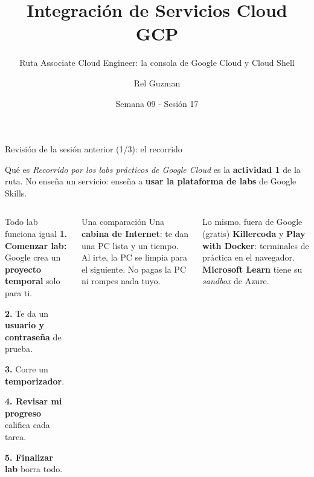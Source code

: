 \documentclass[aspectratio=169,10pt,c]{beamer}
\title{Integración de Servicios Cloud GCP}
\subtitle{Ruta Associate Cloud Engineer: la consola de Google Cloud y Cloud Shell}
\date{Semana 09 - Sesión 17}
\author{Rel Guzman}
\begin{document}
{\maketitle}

\begin{frame}{Revisión de la sesión anterior (1/3): el recorrido}
\begin{block}{Qué es}
\small \emph{Recorrido por los labs prácticos de Google Cloud} es la \textbf{actividad 1} de la ruta. No enseña un servicio: enseña a \textbf{usar la plataforma de labs} de Google Skills.
\end{block}
\begin{columns}[T,onlytextwidth]
\begin{exampleblock}{Todo lab funciona igual}
\small
\textbf{1. Comenzar lab:} Google crea un \textbf{proyecto temporal} solo para ti.\par\smallskip
\textbf{2.} Te da un \textbf{usuario y contraseña} de prueba.\par\smallskip
\textbf{3.} Corre un \textbf{temporizador}.\par\smallskip
\textbf{4. Revisar mi progreso} califica cada tarea.\par\smallskip
\textbf{5. Finalizar lab} borra todo.
\end{exampleblock}
\begin{block}{Una comparación}
\small Una \textbf{cabina de Internet}: te dan una PC lista y un tiempo. Al irte, la PC se limpia para el siguiente. No pagas la PC ni rompes nada tuyo.
\end{block}
\begin{alertblock}{Lo mismo, fuera de Google (gratis)}
\small \textbf{Killercoda} y \textbf{Play with Docker}: terminales de práctica en el navegador. \textbf{Microsoft Learn} tiene su \emph{sandbox} de Azure.
\end{alertblock}
\end{columns}
\end{frame}
\end{document}
